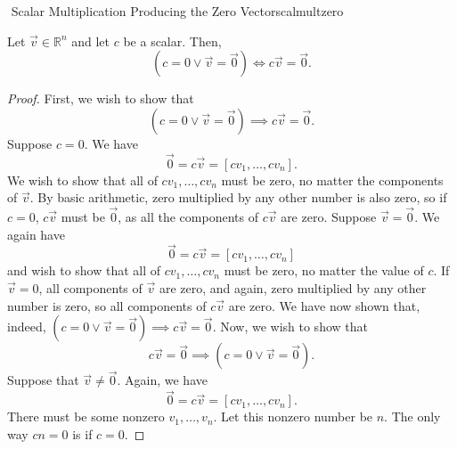     \begin{theorem}{\Stop\,\,Scalar Multiplication Producing the Zero Vector}{scalmultzero}

        Let \(\vec{v}\in\mathbb{R}^n\) and let \(c\) be a scalar. Then,
        \begin{equation*}
            (c=0\vee\vec{v}=\vec{0})\iff c\vec{v}=\vec{0}.
        \end{equation*}
        \begin{proof}
            First, we wish to show that 
            \begin{equation*}
                (c=0\vee\vec{v}=\vec{0})\implies c\vec{v}=\vec{0}.
            \end{equation*}
            Suppose \(c=0\). We have
            \begin{equation*}
                \vec{0}=c\vec{v}=[cv_1,\ldots,cv_n].
            \end{equation*}
            We wish to show that all of \(cv_1,\ldots,cv_n\) must be zero, no matter the components of \(\vec{v}\). By basic arithmetic, zero multiplied by any other number is also zero, so if \(c=0\), \(c\vec{v}\) must be \(\vec{0}\), as all the components of \(c\vec{v}\) are zero. Suppose \(\vec{v}=\vec{0}\). We again have
            \begin{equation*}
                \vec{0}=c\vec{v}=[cv_1,\ldots,cv_n]
            \end{equation*}
            and wish to show that all of \(cv_1,\ldots,cv_n\) must be zero, no matter the value of \(c\). If \(\vec{v}=0\), all components of \(\vec{v}\) are zero, and again, zero multiplied by any other number is zero, so all components of \(c\vec{v}\) are zero. We have now shown that, indeed, \((c=0\vee\vec{v}=\vec{0})\implies c\vec{v}=\vec{0}\). Now, we wish to show that
            \begin{equation*}
                c\vec{v}=\vec{0}\implies(c=0\vee\vec{v}=\vec{0}).
            \end{equation*}
            Suppose that \(\vec{v}\neq\vec{0}\). Again, we have 
            \begin{equation*}
                \vec{0}=c\vec{v}=[cv_1,\ldots,cv_n].
            \end{equation*}
            There must be some nonzero \(v_1,\ldots,v_n\). Let this nonzero number be \(n\). The only way \(cn=0\) is if \(c=0\).
        \end{proof} 
        
    \end{theorem}


